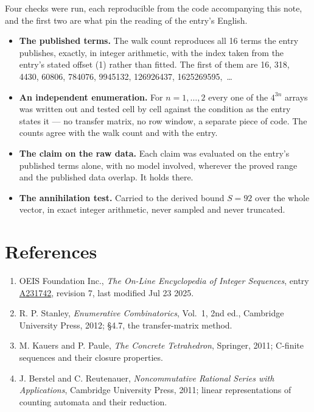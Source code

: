 \documentclass[11pt]{article}
\theoremstyle{definition}
\begin{document}
Four checks were run, each reproducible from the code accompanying this note, and the first two are what pin the reading of the entry's English.

\begin{itemize}

\item {\bfseries The published terms.} The walk count reproduces all 16 terms the entry publishes, exactly, in integer arithmetic, with the index taken from the entry's stated offset (1) rather than fitted. The first of them are 16, 318, 4430, 60806, 784076, 9945132, 126926437, 1625269595,~\dots

\item {\bfseries An independent enumeration.} For $n = 1,\dots,2$ every one of the $4^{3n}$ arrays was written out and tested cell by cell against the condition as the entry states it --- no transfer matrix, no row window, a separate piece of code. The counts agree with the walk count and with the entry.

\item {\bfseries The claim on the raw data.} Each claim was evaluated on the entry's published terms alone, with no model involved, wherever the proved range and the published data overlap. It holds there.

\item {\bfseries The annihilation test.} Carried to the derived bound $S = 92$ over the whole vector, in exact integer arithmetic, never sampled and never truncated.

\end{itemize}

\section{References}

\begin{enumerate}

\item OEIS Foundation Inc., \emph{The On-Line Encyclopedia of Integer Sequences}, entry \href{https://oeis.org/A231742}{A231742}, revision 7, last modified Jul 23 2025.

\item R. P. Stanley, \emph{Enumerative Combinatorics}, Vol.~1, 2nd ed., Cambridge University Press, 2012; \S4.7, the transfer-matrix method.

\item M. Kauers and P. Paule, \emph{The Concrete Tetrahedron}, Springer, 2011; C-finite sequences and their closure properties.

\item J. Berstel and C. Reutenauer, \emph{Noncommutative Rational Series with Applications}, Cambridge University Press, 2011; linear representations of counting automata and their reduction.

\end{enumerate}
\end{document}
